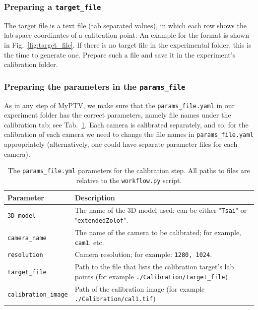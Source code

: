 \documentclass[10pt,a4paper]{article}
\begin{document}
\subsubsection{Preparing a \texttt{target\_file}}\label{sec:target_file}

The target file is a text file (tab separated values), in which each row shows the lab space coordinates of a calibration point.  An example for the format is shown in Fig.~\ref{fig:target_file}. If there is no target file in the experimental folder, this is the time to generate one. Prepare such a file and save it in the experiment's calibration folder.




\subsubsection{Preparing the parameters in the \texttt{params\_file}}

As in any step of MyPTV, we make sure that the \texttt{params\_file.yaml} in our experiment folder has the correct parameters, namely file names under the calibration tab; see Tab.~\ref{tab:cal_paramsfile}. Each camera is calibrated separately, and so, for the calibration of each camera we need to change the file names in \texttt{params\_file.yaml} appropriately (alternatively, one could have separate parameter files for each camera).  

\begin{table}
	\centering
	\caption{The \texttt{params\_file.yml} parameters for the calibration step. All paths to files are relative to the \texttt{workflow.py} script. \label{tab:cal_paramsfile}}
	\begin{tabular}{l m{10cm}}
		\hline
		Parameter & Description\\[.2cm]
		\hline
		
		\texttt{3D\_model} & The name of the 3D model used; can be either "\texttt{Tsai}" or "\texttt{extendedZolof}". \\[.2cm]
		
		\texttt{camera\_name} & The name of the camera to be calibrated; for example, \texttt{cam1}, etc. \\[.2cm]
		
		\texttt{resolution} & Camera resolution; for example: \texttt{1280, 1024}. \\[.2cm]
		
		\texttt{target\_file} & Path to the file that lists the calibration target's lab points (for example \texttt{./Calibration/target\_file}) \\[.2cm]
		
		\texttt{calibration\_image} & Path of the calibration image (for example \texttt{./Calibration/cal1.tif})\\[.2cm]
		
		\hline
	\end{tabular}
\end{table}
\end{document}
